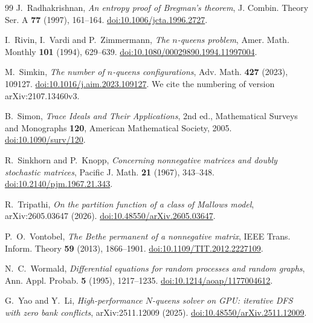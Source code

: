 \begin{thebibliography}{99}
 J.~Radhakrishnan, \emph{An entropy proof of Bregman's theorem},
J. Combin. Theory Ser. A \textbf{77} (1997), 161--164.
\href{https://doi.org/10.1006/jcta.1996.2727}{doi:10.1006/jcta.1996.2727}.

 I.~Rivin, I.~Vardi and P.~Zimmermann, \emph{The $n$-queens problem},
Amer. Math. Monthly \textbf{101} (1994), 629--639.
\href{https://doi.org/10.1080/00029890.1994.11997004}{doi:10.1080/00029890.1994.11997004}.

 M.~Simkin, \emph{The number of $n$-queens configurations}, Adv. Math.
\textbf{427} (2023), 109127.
\href{https://doi.org/10.1016/j.aim.2023.109127}{doi:10.1016/j.aim.2023.109127}. We cite the numbering
of version arXiv:2107.13460v3.

 B.~Simon, \emph{Trace Ideals and Their Applications}, 2nd ed., Mathematical
Surveys and Monographs \textbf{120}, American Mathematical Society, 2005.
\href{https://doi.org/10.1090/surv/120}{doi:10.1090/surv/120}.

 R.~Sinkhorn and P.~Knopp, \emph{Concerning nonnegative matrices and doubly stochastic
matrices}, Pacific J. Math. \textbf{21} (1967), 343--348.
\href{https://doi.org/10.2140/pjm.1967.21.343}{doi:10.2140/pjm.1967.21.343}.

 R.~Tripathi, \emph{On the partition function of a class of Mallows model},
arXiv:2605.03647 (2026).
\href{https://doi.org/10.48550/arXiv.2605.03647}{doi:10.48550/arXiv.2605.03647}.

 P.~O.~Vontobel, \emph{The Bethe permanent of a nonnegative matrix},
IEEE Trans. Inform. Theory \textbf{59} (2013), 1866--1901.
\href{https://doi.org/10.1109/TIT.2012.2227109}{doi:10.1109/TIT.2012.2227109}.

 N.~C.~Wormald, \emph{Differential equations for random processes and random
graphs}, Ann. Appl. Probab. \textbf{5} (1995), 1217--1235.
\href{https://doi.org/10.1214/aoap/1177004612}{doi:10.1214/aoap/1177004612}.

 G.~Yao and Y.~Li, \emph{High-performance $N$-queens solver on GPU: iterative DFS
with zero bank conflicts}, arXiv:2511.12009 (2025).
\href{https://doi.org/10.48550/arXiv.2511.12009}{doi:10.48550/arXiv.2511.12009}.
\end{thebibliography}
